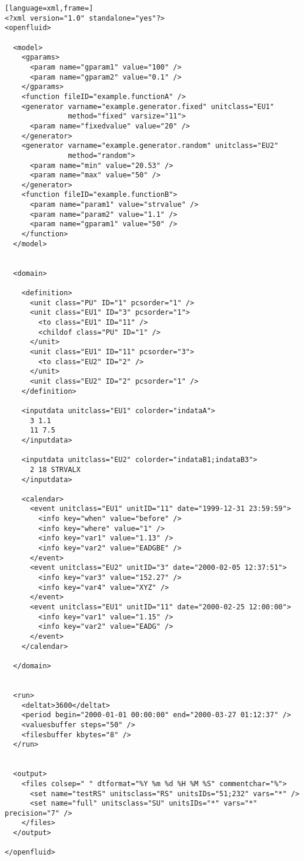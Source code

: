 \begin{lstlisting}[language=xml,frame=]
<?xml version="1.0" standalone="yes"?>
<openfluid>

  <model>
    <gparams>
      <param name="gparam1" value="100" />
      <param name="gparam2" value="0.1" />
    </gparams>
    <function fileID="example.functionA" />
    <generator varname="example.generator.fixed" unitclass="EU1"
               method="fixed" varsize="11">
      <param name="fixedvalue" value="20" />
    </generator>
    <generator varname="example.generator.random" unitclass="EU2" 
               method="random">
      <param name="min" value="20.53" />
      <param name="max" value="50" />
    </generator>
    <function fileID="example.functionB">
      <param name="param1" value="strvalue" />
      <param name="param2" value="1.1" />
      <param name="gparam1" value="50" />
    </function>
  </model>


  <domain>

    <definition>
      <unit class="PU" ID="1" pcsorder="1" />
      <unit class="EU1" ID="3" pcsorder="1">
        <to class="EU1" ID="11" />
        <childof class="PU" ID="1" />
      </unit>
      <unit class="EU1" ID="11" pcsorder="3">
        <to class="EU2" ID="2" />
      </unit>
      <unit class="EU2" ID="2" pcsorder="1" />
    </definition>

    <inputdata unitclass="EU1" colorder="indataA">
      3 1.1
      11 7.5
    </inputdata>
    
    <inputdata unitclass="EU2" colorder="indataB1;indataB3">
      2 18 STRVALX
    </inputdata>
    
    <calendar>
      <event unitclass="EU1" unitID="11" date="1999-12-31 23:59:59">
        <info key="when" value="before" />
        <info key="where" value="1" />
        <info key="var1" value="1.13" />
        <info key="var2" value="EADGBE" />
      </event>
      <event unitclass="EU2" unitID="3" date="2000-02-05 12:37:51">
        <info key="var3" value="152.27" />
        <info key="var4" value="XYZ" />
      </event>
      <event unitclass="EU1" unitID="11" date="2000-02-25 12:00:00">
        <info key="var1" value="1.15" />
        <info key="var2" value="EADG" />
      </event>
    </calendar>
    
  </domain>


  <run>
    <deltat>3600</deltat>
    <period begin="2000-01-01 00:00:00" end="2000-03-27 01:12:37" />
    <valuesbuffer steps="50" />
    <filesbuffer kbytes="8" />
  </run>


  <output>
    <files colsep=" " dtformat="%Y %m %d %H %M %S" commentchar="%">
      <set name="testRS" unitsclass="RS" unitsIDs="51;232" vars="*" />
      <set name="full" unitsclass="SU" unitsIDs="*" vars="*" precision="7" />
    </files>
  </output>

</openfluid>
\end{lstlisting}

